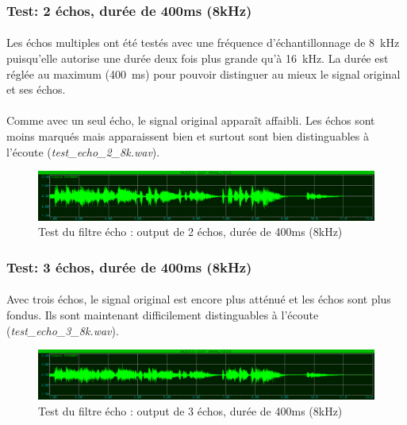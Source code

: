 \documentclass{article}
\begin{document}
    \subsubsection{Test: 2 échos, durée de 400ms (8kHz)}
    \paragraph{}
    Les échos multiples ont été testés avec une fréquence d'échantillonnage de \SI{8}{\kilo\hertz} puisqu'elle autorise une durée deux fois plus grande qu'à \SI{16}{\kilo\hertz}. La durée est réglée au maximum (\SI{400}{\milli\second}) pour pouvoir distinguer au mieux le signal original et ses échos.

    \paragraph{}
    Comme avec un seul écho, le signal original apparaît affaibli. Les échos sont moins marqués mais apparaissent bien et surtout sont bien distinguables à l'écoute (\emph{test\_echo\_2\_8k.wav}).
    \begin{figure}[H]
        \centering
        \includegraphics[width=\textwidth]{./images/out_echo_2_8k.png}
        \caption{Test du filtre écho : output de 2 échos, durée de 400ms (8kHz)}
    \end{figure}

    \subsubsection{Test: 3 échos, durée de 400ms (8kHz)}
    \paragraph{}
    Avec trois échos, le signal original est encore plus atténué et les échos sont plus fondus. Ils sont maintenant difficilement distinguables à l'écoute (\emph{test\_echo\_3\_8k.wav}).

    \begin{figure}[H]
        \centering
        \includegraphics[width=\textwidth]{./images/out_echo_3_8k.png}
        \caption{Test du filtre écho : output de 3 échos, durée de 400ms (8kHz)}
    \end{figure}
\end{document}
